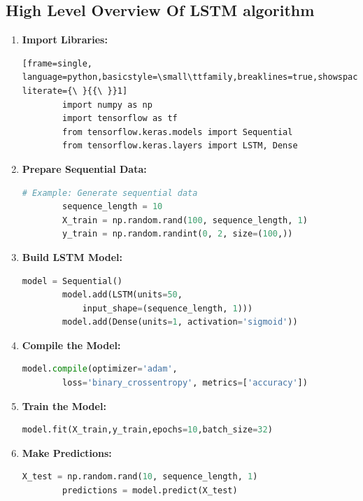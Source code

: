 \documentclass[./main.tex]{subfiles}
\begin{document}
\subsection{High Level Overview Of LSTM algorithm}
\begin{enumerate}
    \item \textbf{Import Libraries:}
    \begin{lstlisting}[frame=single, language=python,basicstyle=\small\ttfamily,breaklines=true,showspaces=false,columns=fullflexible, literate={\ }{{\ }}1]
        import numpy as np
        import tensorflow as tf
        from tensorflow.keras.models import Sequential
        from tensorflow.keras.layers import LSTM, Dense
        \end{lstlisting}

    \item \textbf{Prepare Sequential Data:}
        \begin{lstlisting}[frame=single, language=python]
        # Example: Generate sequential data
        sequence_length = 10
        X_train = np.random.rand(100, sequence_length, 1)
        y_train = np.random.randint(0, 2, size=(100,))
        \end{lstlisting}

    \item \textbf{Build LSTM Model:}
        \begin{lstlisting}[frame=single, language=python]
        model = Sequential()
        model.add(LSTM(units=50, 
            input_shape=(sequence_length, 1)))
        model.add(Dense(units=1, activation='sigmoid'))
        \end{lstlisting}

    \item \textbf{Compile the Model:}
        \begin{lstlisting}[frame=single, language=python]
        model.compile(optimizer='adam',
        loss='binary_crossentropy', metrics=['accuracy'])
        \end{lstlisting}

    \item \textbf{Train the Model:}
        \begin{lstlisting}[frame=single, language=python]
        model.fit(X_train,y_train,epochs=10,batch_size=32)
        \end{lstlisting}

    \item \textbf{Make Predictions:}
        \begin{lstlisting}[frame=single, language=python]
        X_test = np.random.rand(10, sequence_length, 1)
        predictions = model.predict(X_test)
        \end{lstlisting}


\end{enumerate}
\end{document}
